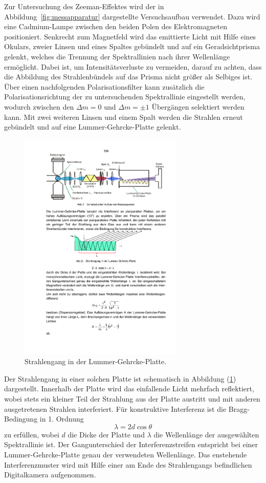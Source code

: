 Zur Untersuchung des Zeeman-Effektes wird der in Abbildung~\ref{fig:messapparatur} dargestellte
Versuchsaufbau verwendet. Dazu wird eine Cadmium-Lampe zwischen den beiden Polen des Elektromagneten positioniert.
Senkrecht zum Magnetfeld wird das emittierte Licht mit Hilfe eines Okulars, zweier Linsen und eines
Spaltes gebündelt und auf ein Geradsichtprisma gelenkt, welches die Trennung der Spektrallinien nach
ihrer Wellenlänge ermöglicht.
Dabei ist, um Intensitätsverluste zu vermeiden, darauf zu achten, dass die Abbildung des Strahlenbündels
auf das Prisma nicht größer als Selbiges ist.
Über einen nachfolgenden Polarisationsfilter kann zusätzlich die Polarisationsrichtung der zu untersuchenden
Spektrallinie eingestellt werden, wodurch zwischen den $\Delta m=0$ und $\Delta m=\pm1$ Übergängen selektiert werden kann.
Mit zwei weiteren Linsen und einem Spalt werden die Strahlen erneut gebündelt und auf eine Lummer-Gehrcke-Platte gelenkt.
\begin{figure}
    \centering
    \includegraphics[width=0.7\textwidth]{graphics/lummer-gehrcke.pdf}
    \caption{Strahlengang in der Lummer-Gehrcke-Platte. \cite[2]{Anleitung1}}
    \label{fig:lummer-gehrcke}
\end{figure}
Der Strahlengang in einer solchen Platte ist schematisch in Abbildung (\ref{fig:lummer-gehrcke}) dargestellt.
Innerhalb der Platte wird das einfallende Licht mehrfach reflektiert, wobei stets ein kleiner Teil der
Strahlung aus der Platte austritt und mit anderen ausgetretenen Strahlen interferiert.
Für konstruktive Interferenz ist die Bragg-Bedingung in 1. Ordnung
\begin{equation}
    \lambda=2d\cos\theta
\end{equation}
zu erfüllen, wobei $d$ die Dicke der Platte und $\lambda$ die Wellenlänge der ausgewählten Spektrallinie ist.
Der Gangunterschied der Interferenzstreifen entspricht bei einer Lummer-Gehrcke-Platte genau der verwendeten Wellenlänge.
Das enstehende Interferenzmuster wird mit Hilfe einer am Ende des Strahlengangs befindlichen Digitalkamera aufgenommen.

